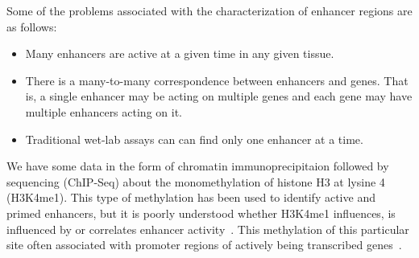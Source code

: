 
        Some of the problems associated with the characterization of enhancer regions are as follows:
            \begin{itemize}
        		\item Many enhancers are active at a given time in any given tissue. 
        		\item There is a many-to-many correspondence between enhancers and genes. That is, a single enhancer may be acting on multiple genes and each gene may have multiple enhancers acting on it. 
        		\item Traditional wet-lab assays can can find only one enhancer at a time. 
        	\end{itemize}
        	
        	
        We have some data in the form of chromatin immunoprecipitaion followed by sequencing (ChIP-Seq) about the monomethylation of histone H3 at lysine 4 (H3K4me1). This type of methylation has been used to identify active and primed enhancers, but it is poorly understood whether H3K4me1 influences, is influenced by or correlates enhancer activity~\cite{rada2018h3k4me1}. This methylation of this particular site often associated with promoter regions of actively being transcribed genes~\cite{barski2007high}. 
        


        
        
        

        
        

